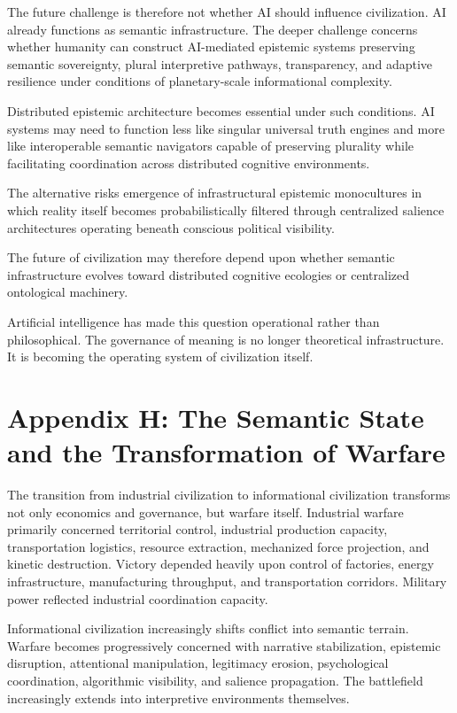 \documentclass[11pt,a4paper]{article}
\begin{document}
The future challenge is therefore not whether AI should influence civilization. AI already functions as semantic infrastructure. The deeper challenge concerns whether humanity can construct AI-mediated epistemic systems preserving semantic sovereignty, plural interpretive pathways, transparency, and adaptive resilience under conditions of planetary-scale informational complexity.

Distributed epistemic architecture becomes essential under such conditions. AI systems may need to function less like singular universal truth engines and more like interoperable semantic navigators capable of preserving plurality while facilitating coordination across distributed cognitive environments.

The alternative risks emergence of infrastructural epistemic monocultures in which reality itself becomes probabilistically filtered through centralized salience architectures operating beneath conscious political visibility.

The future of civilization may therefore depend upon whether semantic infrastructure evolves toward distributed cognitive ecologies or centralized ontological machinery.

Artificial intelligence has made this question operational rather than philosophical. The governance of meaning is no longer theoretical infrastructure. It is becoming the operating system of civilization itself.

\section{Appendix H: The Semantic State and the Transformation of Warfare}

The transition from industrial civilization to informational civilization transforms not only economics and governance, but warfare itself. Industrial warfare primarily concerned territorial control, industrial production capacity, transportation logistics, resource extraction, mechanized force projection, and kinetic destruction. Victory depended heavily upon control of factories, energy infrastructure, manufacturing throughput, and transportation corridors. Military power reflected industrial coordination capacity.

Informational civilization increasingly shifts conflict into semantic terrain. Warfare becomes progressively concerned with narrative stabilization, epistemic disruption, attentional manipulation, legitimacy erosion, psychological coordination, algorithmic visibility, and salience propagation. The battlefield increasingly extends into interpretive environments themselves.
\end{document}
